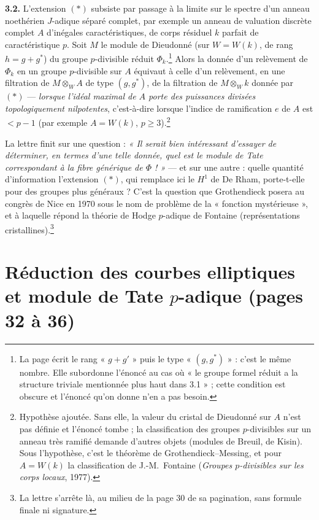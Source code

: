\documentclass[11pt,a4paper]{article}
\begin{document}
\textbf{3.2.} L'extension $(*)$ subsiste par passage à la limite sur le
spectre d'un anneau noethérien $J$-adique séparé complet, par exemple un anneau
de valuation discrète complet $A$ d'inégales caractéristiques, de corps
résiduel $k$ parfait de caractéristique $p$. Soit $M$ le module de Dieudonné
(sur $W = W(k)$, de rang $h = g + g^*$) du groupe $p$-divisible réduit
$\Phi_k$.\footnote{La page écrit le rang « $g+g'$ » puis le type « $(g,g^*)$ » :
c'est le même nombre. Elle subordonne l'énoncé au cas où « le groupe formel
réduit a la structure triviale mentionnée plus haut dans 3.1 » ; cette
condition est obscure et l'énoncé qu'on donne n'en a pas besoin.} Alors la
donnée d'un relèvement de $\Phi_k$ en un groupe $p$-divisible sur $A$ équivaut
à celle d'un relèvement, en une filtration de $M \otimes_W A$ de type
$(g, g^*)$, de la filtration de $M \otimes_W k$ donnée par $(*)$ — \emph{lorsque
l'idéal maximal de $A$ porte des puissances divisées topologiquement
nilpotentes}, c'est-à-dire lorsque l'indice de ramification $e$ de $A$ est
$< p - 1$ (par exemple $A = W(k)$, $p \geq 3$).\footnote{Hypothèse ajoutée.
Sans elle, la valeur du cristal de Dieudonné sur $A$ n'est pas définie et
l'énoncé tombe ; la classification des groupes $p$-divisibles sur un anneau
très ramifié demande d'autres objets (modules de Breuil, de Kisin). Sous
l'hypothèse, c'est le théorème de Grothendieck--Messing, et pour
$A = W(k)$ la classification de J.-M.~Fontaine (\emph{Groupes $p$-divisibles
sur les corps locaux}, 1977).}

La lettre finit sur une question : \emph{« Il serait bien intéressant
d'essayer de déterminer, en termes d'une telle donnée, quel est le module de
Tate correspondant à la fibre générique de $\Phi$ ! »} — et sur une autre :
quelle quantité d'information l'extension $(*)$, qui remplace ici le $H^1$ de
De Rham, porte-t-elle pour des groupes plus généraux ? C'est la question que
Grothendieck posera au congrès de Nice en 1970 sous le nom de problème de la
« fonction mystérieuse », et à laquelle répond la théorie de Hodge $p$-adique
de Fontaine (représentations cristallines).\footnote{La lettre s'arrête là, au
milieu de la page 30 de sa pagination, sans formule finale ni signature.}

\section*{Réduction des courbes elliptiques et module de Tate $p$-adique (pages 32 à 36)}
\end{document}
